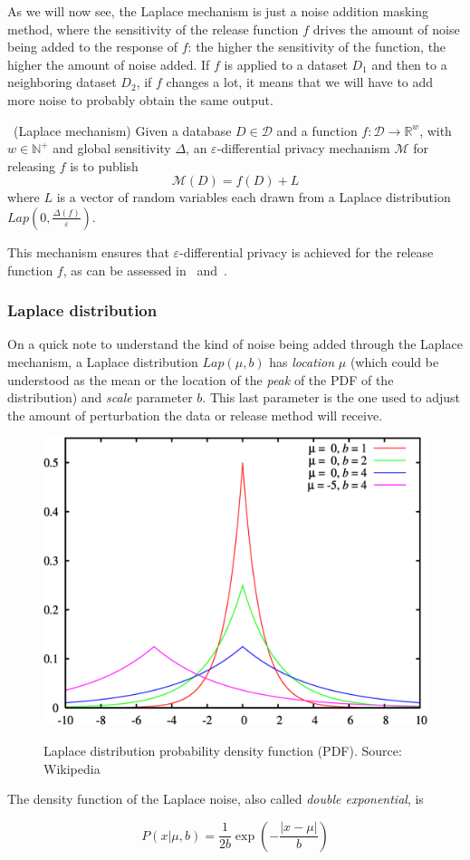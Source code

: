 As we will now see, the Laplace mechanism is just a noise addition masking method, where the sensitivity of the release function $f$ drives the amount of noise being added to the response of $f$: the higher the sensitivity of the function, the higher the amount of noise added. If $f$ is applied to a dataset $D_1$ and then to a neighboring dataset $D_2$, if $f$ changes a lot, it means that we will have to add more noise to probably obtain the same output.

\begin{definition}~(Laplace mechanism)
Given a database $D \in \mathcal{D}$ and a function $f : \mathcal{D} \rightarrow \mathbb{R}^w$, with $w \in \mathbb{N}^+$ and global sensitivity $\Delta$, an $\varepsilon$-differential privacy mechanism $\mathcal{M}$ for releasing $f$ is to publish
\begin{equation}
\mathcal{M}(D) = f(D) + L
\end{equation}
where $L$ is a vector of random variables each drawn from a Laplace distribution $Lap(0, \frac{\Delta(f)}{\varepsilon})$.
\end{definition}

This mechanism ensures that $\varepsilon$-differential privacy is achieved for the release function $f$, as can be assessed in~\citet{Leoni:NonInteractiveDiffPriv} and~\citet{Domingo:EnhancingDiffPrivMicroaggregation}.

\subsubsection*{Laplace distribution}

On a quick note to understand the kind of noise being added through the Laplace mechanism, a Laplace distribution $Lap(\mu, b)$ has \textit{location} $\mu$ (which could be understood as the mean or the location of the \textit{peak} of the PDF of the distribution) and \textit{scale} parameter $b$. This last parameter is the one used to adjust the amount of perturbation the data or release method will receive.

\begin{figure}[h]
	\centering
	\includegraphics[width=0.5\linewidth]{figures/laplace-pdf.png}
	\label{fig:laplace-pdf}
	\caption{Laplace distribution probability density function (PDF). Source: Wikipedia~\cite{web:Wiki:LaplaceDist}}
\end{figure}

The density function of the Laplace noise, also called \textit{double exponential}, is

\begin{equation}
P(x|\mu,b) = \frac{1}{2b}\exp(-\frac{|x-\mu|}{b})
\end{equation}






